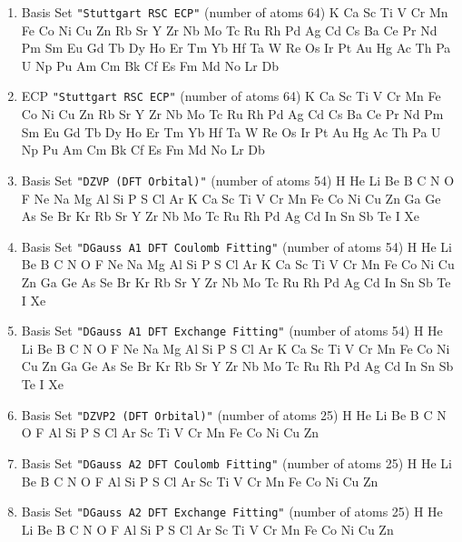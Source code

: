 \begin{enumerate}
\item Basis Set \verb#"Stuttgart RSC ECP"# (number of atoms 64)  \newline 
  K Ca Sc Ti V Cr Mn Fe Co Ni Cu Zn Rb Sr Y Zr Nb Mo Tc Ru Rh Pd Ag Cd Cs
 Ba Ce Pr Nd Pm Sm Eu Gd Tb Dy Ho Er Tm Yb Hf Ta W Re Os Ir Pt Au Hg Ac Th
 Pa U Np Pu Am Cm Bk Cf Es Fm Md No Lr Db


\item ECP \verb#"Stuttgart RSC ECP"# (number of atoms 64)  \newline 
  K Ca Sc Ti V Cr Mn Fe Co Ni Cu Zn Rb Sr Y Zr Nb Mo Tc Ru Rh Pd Ag Cd Cs
 Ba Ce Pr Nd Pm Sm Eu Gd Tb Dy Ho Er Tm Yb Hf Ta W Re Os Ir Pt Au Hg Ac Th
 Pa U Np Pu Am Cm Bk Cf Es Fm Md No Lr Db


\item Basis Set \verb#"DZVP (DFT Orbital)"# (number of atoms 54)  \newline 
  H He Li Be B C N O F Ne Na Mg Al Si P S Cl Ar K Ca Sc Ti V Cr Mn
 Fe Co Ni Cu Zn Ga Ge As Se Br Kr Rb Sr Y Zr Nb Mo Tc Ru Rh Pd Ag Cd In Sn
 Sb Te I Xe


\item Basis Set \verb#"DGauss A1 DFT Coulomb Fitting"# (number of atoms 54)  \newline 
  H He Li Be B C N O F Ne Na Mg Al Si P S Cl Ar K Ca Sc Ti V Cr Mn
 Fe Co Ni Cu Zn Ga Ge As Se Br Kr Rb Sr Y Zr Nb Mo Tc Ru Rh Pd Ag Cd In Sn
 Sb Te I Xe


\item Basis Set \verb#"DGauss A1 DFT Exchange Fitting"# (number of atoms 54)  \newline 
  H He Li Be B C N O F Ne Na Mg Al Si P S Cl Ar K Ca Sc Ti V Cr Mn
 Fe Co Ni Cu Zn Ga Ge As Se Br Kr Rb Sr Y Zr Nb Mo Tc Ru Rh Pd Ag Cd In Sn
 Sb Te I Xe


\item Basis Set \verb#"DZVP2 (DFT Orbital)"# (number of atoms 25)  \newline 
  H He Li Be B C N O F Al Si P S Cl Ar Sc Ti V Cr Mn Fe Co Ni Cu Zn



\item Basis Set \verb#"DGauss A2 DFT Coulomb Fitting"# (number of atoms 25)  \newline 
  H He Li Be B C N O F Al Si P S Cl Ar Sc Ti V Cr Mn Fe Co Ni Cu Zn



\item Basis Set \verb#"DGauss A2 DFT Exchange Fitting"# (number of atoms 25)  \newline 
  H He Li Be B C N O F Al Si P S Cl Ar Sc Ti V Cr Mn Fe Co Ni Cu Zn




\end{enumerate}
